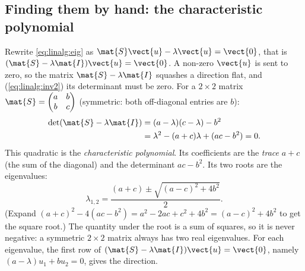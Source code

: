 \subsection{Finding them by hand: the characteristic polynomial}

Rewrite \cref{eq:linalg:eig} as $\mat{S}\vect{u} - \lambda\vect{u} = \vect{0}$, that is
$(\mat{S} - \lambda\mat{I})\vect{u} = \vect{0}$. A non-zero $\vect{u}$ is sent to zero, so the
matrix $\mat{S} - \lambda\mat{I}$ squashes a direction flat, and (\cref{eq:linalg:inv2}) its
determinant must be zero. For a $2\times2$ matrix
$\mat{S} = \begin{pmatrix} a & b\\ b & c\end{pmatrix}$ (symmetric: both off-diagonal entries are
$b$):
\begin{align}
\det(\mat{S} - \lambda\mat{I}) &= (a - \lambda)(c - \lambda) - b^2 \notag\\
&= \lambda^2 - (a + c)\lambda + (ac - b^2) = 0 .
  \label{eq:linalg:charpoly}
\end{align}
This quadratic is the \emph{characteristic polynomial}. Its
coefficients are the \emph{trace} $a + c$ (the sum of the diagonal) and the determinant
$ac - b^2$. Its two roots are the eigenvalues:
\begin{equation}\label{eq:linalg:eig2}
\lambda_{1,2} = \frac{(a + c) \pm \sqrt{(a - c)^2 + 4b^2}}{2}.
\end{equation}
(Expand $(a+c)^2 - 4(ac - b^2) = a^2 - 2ac + c^2 + 4b^2 = (a-c)^2 + 4b^2$ to get the square root.)
The quantity under the root is a sum of squares, so it is never negative: a symmetric
$2\times2$ matrix always has two real eigenvalues. For each eigenvalue, the first row of
$(\mat{S} - \lambda\mat{I})\vect{u} = \vect{0}$, namely $(a - \lambda)u_1 + b u_2 = 0$, gives the
direction.

